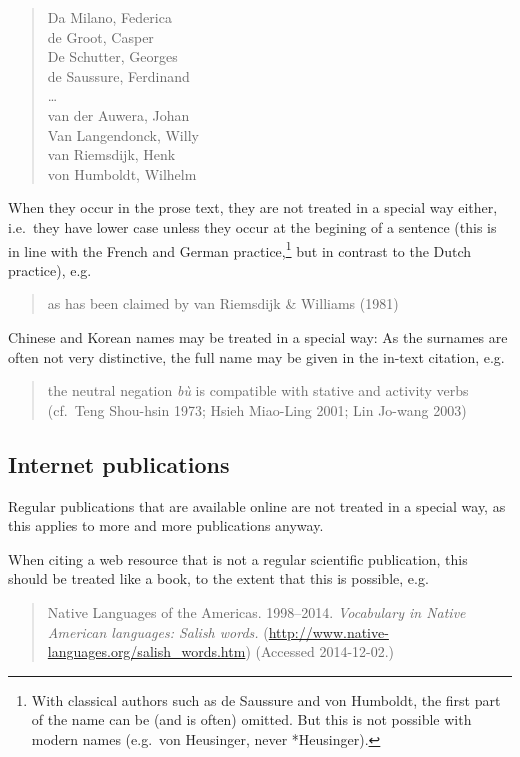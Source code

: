 \documentclass[a4paper]{article}
\newenvironment{gsrexq}{\begin{quote}\color{blue}}{\end{quote}}
\begin{document}
\begin{gsrexq}
Da Milano, Federica \\
de Groot, Casper\\
De Schutter, Georges \\
de Saussure, Ferdinand\\
{\dots}\\
van der Auwera, Johan\\
Van Langendonck, Willy\\
van Riemsdijk, Henk\\
von Humboldt, Wilhelm\\
\end{gsrexq}

When they occur in the prose text, they are not
treated in a special way either, i.e.~they have lower case unless they
occur at the begining of a sentence (this is in line with the French and
German practice,\footnote{With
  classical authors such as de Saussure and von Humboldt, the first part of the name can be (and is often) omitted. But this is not possible with modern names (e.g.~von Heusinger, never *Heusinger).
}
but in contrast to the Dutch practice), e.g.
\begin{gsrexq}
as has been claimed by van Riemsdijk \& Williams (1981)
\end{gsrexq}
Chinese and Korean names may
be treated in a special way: As the surnames are often not very
distinctive, the full name may be given in the in-text citation,
e.g.

\begin{gsrexq}
the neutral negation \textit{bù} is compatible with stative and activity
verbs (cf.~Teng Shou-hsin 1973; Hsieh Miao-Ling 2001; Lin Jo-wang 2003)
\end{gsrexq}

\subsection{Internet publications}\label{sec:internet-publications}

Regular publications that are available online are not treated in a
special way, as this applies to more and more publications anyway. 

When citing a web resource that is not a regular scientific publication, this
should be treated like a book, to the extent that this is possible,
e.g.

\begin{gsrexq}
Native Languages of the Americas. 1998--2014. \textit{Vocabulary in Native American languages: Salish words.} (\url{http://www.native-languages.org/salish_words.htm}) (Accessed 2014-12-02.)
\end{gsrexq}
\end{document}

